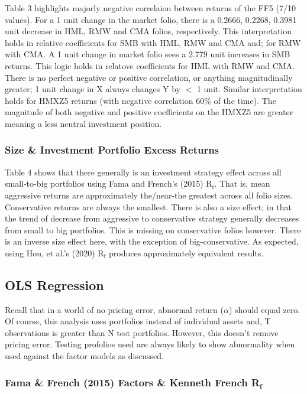 \documentclass[11pt, english]{article}
\begin{document}
	Table 3 highlights majorly negative correlaion between returns of the FF5 (7/10 values). For a 1 unit change in the market folio, there is a 0.2666, 0.2268, 0.3981 unit decrease in HML, RMW and CMA folios, respectively. This interpretation holds in relative coefficients for SMB with HML, RMW and CMA and; for RMW with CMA. A 1 unit change in market folio sees a 2.779 unit increases in SMB returns. This logic holds in relatove coefficients for HML with RMW and CMA. There is no perfect negative or positive correlation, or anything magnitudinally greater; 1 unit change in X always changes Y by $<$ 1 unit. Similar interpretation holds for HMXZ5 returns (with negative correlation 60\% of the time). The magnitude of both negative and positive coefficients on the HMXZ5 are greater meaning a less neutral investment position.

		\subsubsection{Size \& Investment Portfolio Excess Returns}

	Table 4 shows that there generally is an investment strategy effect across all small-to-big portfolios using Fama and French's (2015) R$\mathrm{_f}$. That is, mean aggressive returns are approximately the/near-the greatest across all folio sizes. Conservative returns are always the smallest. There is also a size effect; in that the trend of decrease from aggressive to conservative strategy generally decreases from small to big portfolios. This is missing on conservative folios however. There is an inverse size effect here, with the exception of big-conservative. As expected, using Hou, et al.'s (2020) R$\mathrm{_f}$ produces approximately equivalent results.

	\subsection{OLS Regression}
	
	Recall that in a world of no pricing error, abnormal return ($\alpha$) should equal zero. Of course, this analysis uses portfolios instead of individual assets and, T observations is greater than N test portfolios. However, this doesn't remove pricing error. Testing profolios used are always likely to show abnormality when used against the factor models as discussed. 

		\subsubsection{Fama \& French (2015) Factors \& Kenneth French R$\mathbf{_f}$}
\end{document}
